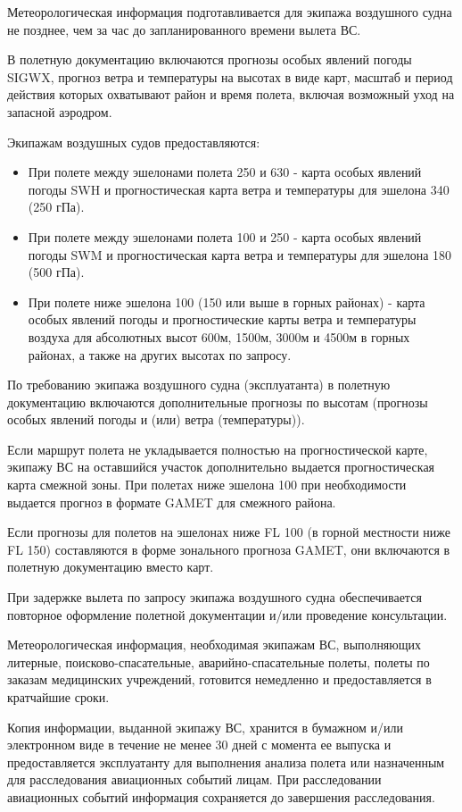 Метеорологическая информация подготавливается для экипажа воздушного судна не позднее, чем за час до запланированного времени вылета ВС.

В полетную документацию включаются прогнозы особых явлений погоды SIGWX, прогноз ветра и температуры на высотах в виде карт, масштаб и период действия которых охватывают район и время полета, включая возможный уход на запасной аэродром.

Экипажам воздушных судов предоставляются: 
\begin{itemize}
    \item При полете между эшелонами полета 250 и 630 - карта особых явлений погоды SWH и прогностическая карта ветра и температуры для эшелона 340 (250 гПа). 
    \item При полете между эшелонами полета 100 и 250 - карта особых явлений погоды SWM и прогностическая карта ветра и температуры для эшелона 180 (500 гПа).
    \item При полете ниже эшелона 100 (150 или выше в горных районах) - карта особых явлений погоды и прогностические карты ветра и температуры воздуха для абсолютных высот 600м, 1500м, 3000м и 4500м в горных районах, а также на других высотах по запросу.
\end{itemize}

По требованию экипажа воздушного судна (эксплуатанта) в полетную документацию включаются дополнительные прогнозы по высотам (прогнозы особых явлений погоды и (или) ветра (температуры)). 

Если маршрут полета не укладывается полностью на прогностической карте, экипажу ВС на оставшийся участок дополнительно выдается прогностическая карта смежной зоны. При полетах ниже эшелона 100 при необходимости выдается прогноз в формате GAMET для смежного района.

Если прогнозы для полетов на эшелонах ниже FL 100 (в горной местности ниже FL 150) составляются в форме зонального прогноза GAMET, они включаются в полетную документацию вместо карт. 

При задержке вылета по запросу экипажа воздушного судна обеспечивается повторное оформление полетной документации и/или проведение консультации. 

 Метеорологическая информация, необходимая экипажам ВС, выполняющих литерные, поисково-спасательные, аварийно-спасательные полеты, полеты по заказам медицинских учреждений, готовится немедленно и предоставляется в кратчайшие сроки. 

Копия информации, выданной экипажу ВС, хранится в бумажном и/или электронном виде в течение не менее 30 дней с момента ее выпуска и предоставляется эксплуатанту для выполнения анализа полета или назначенным для расследования авиационных событий лицам. При расследовании авиационных событий информация сохраняется до завершения расследования. 


